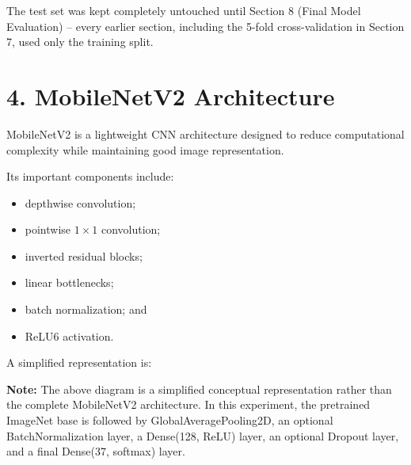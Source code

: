 \documentclass[10pt]{article}
\begin{document}
The test set was kept completely untouched until Section 8 (Final
Model Evaluation) -- every earlier section, including the 5-fold
cross-validation in Section 7, used only the training split.

\section*{4. MobileNetV2 Architecture}

MobileNetV2 is a lightweight CNN architecture designed to reduce
computational complexity while maintaining good image representation.

Its important components include:

\begin{itemize}
\item depthwise convolution;
\item pointwise $1\times1$ convolution;
\item inverted residual blocks;
\item linear bottlenecks;
\item batch normalization; and
\item ReLU6 activation.
\end{itemize}

A simplified representation is:

\begin{center}
\end{center}

\textbf{Note:} The above diagram is a simplified conceptual representation
rather than the complete MobileNetV2 architecture. In this experiment,
the pretrained ImageNet base is followed by GlobalAveragePooling2D,
an optional BatchNormalization layer, a Dense(128, ReLU) layer, an
optional Dropout layer, and a final Dense(37, softmax) layer.
\end{document}
